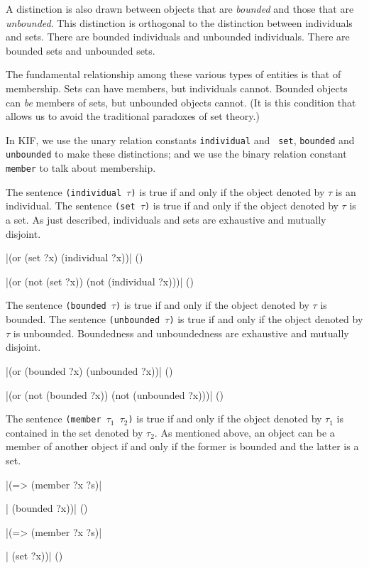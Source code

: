 A distinction is also drawn between objects that are {\it bounded} and those
that are {\it unbounded}.  This distinction is orthogonal to the distinction
between individuals and sets.  There are bounded individuals and unbounded
individuals.  There are bounded sets and unbounded sets.

The fundamental relationship among these various types of entities is that
of membership.  Sets can have members, but individuals cannot.  Bounded objects can
{\it be} members of sets, but unbounded objects cannot.  (It is this condition that
allows us to avoid the traditional paradoxes of set theory.)  

In KIF, we use the unary relation constants {\tt individual} and {\tt
set}, {\tt bounded} and {\tt unbounded} to make these distinctions; and we
use the binary relation constant {\tt member} to talk about membership.

The sentence {\tt (individual $\tau$)} is true if and only if the object
denoted by $\tau$ is an individual.  The sentence {\tt (set $\tau$)} is
true if and only if the object denoted by $\tau$ is a set.  As just
described, individuals and sets are exhaustive and mutually disjoint.

\medskip
\verbatim|(or (set ?x) (individual ?x))|
\hfill(\equation)\par
\medskip
\verbatim|(or (not (set ?x)) (not (individual ?x)))|
\hfill(\equation)\par
\medskip

The sentence {\tt (bounded $\tau$)} is true if and only if the object denoted
by $\tau$ is bounded.  The sentence {\tt (unbounded $\tau$)} is true if
and only if the object denoted by $\tau$ is unbounded.  Boundedness and
unboundedness are exhaustive and mutually disjoint.

\medskip
\verbatim|(or (bounded ?x) (unbounded ?x))|
\hfill(\equation)\par
\medskip
\verbatim|(or (not (bounded ?x)) (not (unbounded ?x)))|
\hfill(\equation)\par
\medskip

The sentence {\tt (member $\tau_1$ $\tau_2$)} is true if and only if the
object denoted by $\tau_1$ is contained in the set denoted by $\tau_2$. 
As mentioned above, an object can be a member of another object if and only
if the former is bounded and the latter is a set.

\medskip
\verbatim|(=> (member ?x ?s)|\par
\verbatim|    (bounded ?x))|
\hfill(\equation)\par
\medskip
\verbatim|(=> (member ?x ?s)|\par
\verbatim|    (set ?x))|
\hfill(\equation)\par
\medskip

